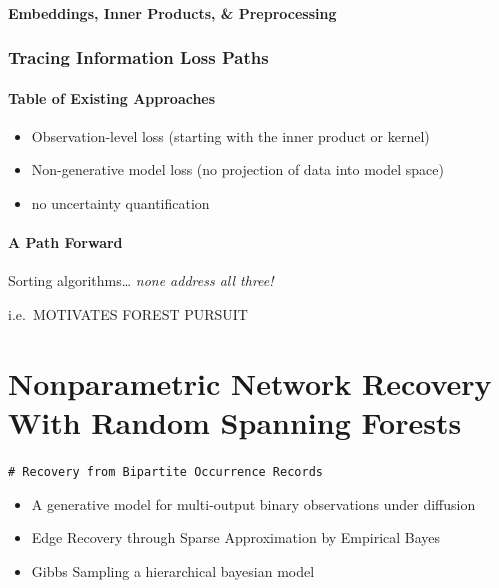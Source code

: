 \documentclass[%
	12pt,
		oneside,
		letterpaper
]{book}
\providecommand{\tightlist}{%
  \setlength{\itemsep}{0pt}\setlength{\parskip}{0pt}}\usepackage{longtable,booktabs,array}
\begin{document}
\subsection{Embeddings, Inner Products, \&
Preprocessing}\label{embeddings-inner-products-preprocessing}

\section{Tracing Information Loss
Paths}\label{tracing-information-loss-paths}

\subsection{Table of Existing
Approaches}\label{table-of-existing-approaches}

\begin{itemize}
\tightlist
\item
  Observation-level loss (starting with the inner product or kernel)
\item
  Non-generative model loss (no projection of data into model space)
\item
  no uncertainty quantification
\end{itemize}

\subsection{A Path Forward}\label{a-path-forward}

Sorting algorithms\ldots{} \emph{none address all three!}

i.e.~MOTIVATES FOREST PURSUIT

\part{Nonparametric Network Recovery With Random Spanning Forests}

\texttt{\#\ Recovery\ from\ Bipartite\ Occurrence\ Records}

\begin{itemize}
\tightlist
\item
  A generative model for multi-output binary observations under
  diffusion
\item
  Edge Recovery through Sparse Approximation by Empirical Bayes
\item
  Gibbs Sampling a hierarchical bayesian model
\end{itemize}
\end{document}
